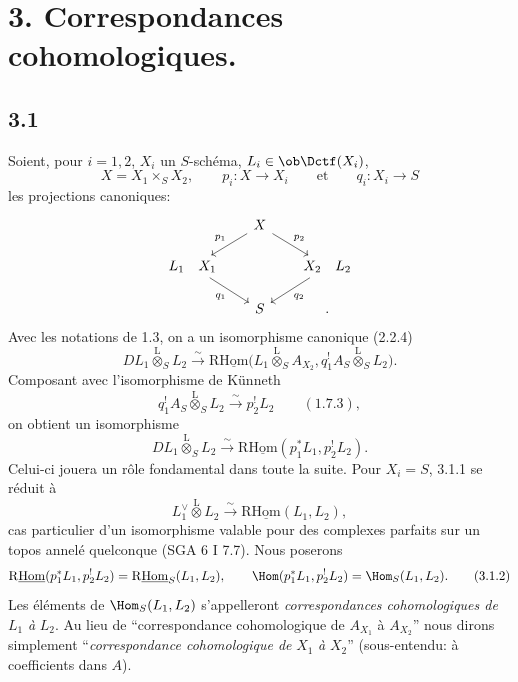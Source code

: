\clearpage
\section*{3. Correspondances cohomologiques.}

\subsection*{3.1}
Soient, pour $i=1,2$, $X_i$ un $S$-schéma, $L_i\in\ob\Dctf(X_i)$,
\[
X=X_1\times_S X_2,
\qquad
p_i:X\longrightarrow X_i
\qquad\text{et}\qquad
q_i:X_i\longrightarrow S
\]
les projections canoniques:
\[
\begin{tikzcd}[column sep=1.8em,row sep=1.5em]
& X \arrow[dl,"p_1"'] \arrow[dr,"p_2"] & \\
L_1\quad X_1 \arrow[dr,"q_1"'] & & X_2\quad L_2 \arrow[dl,"q_2"] \\
& S & .
\end{tikzcd}
\]
Avec les notations de 1.3, on a un isomorphisme canonique (2.2.4)
\[
DL_1\overset{\mathrm{L}}{\otimes}_S L_2
\xrightarrow{\sim}
\mathrm{R}\underline{\mathrm{Hom}}\bigl(L_1\overset{\mathrm{L}}{\otimes}_S A_{X_2},
q_1^!A_S\overset{\mathrm{L}}{\otimes}_S L_2\bigr).
\]
Composant avec l'isomorphisme de Künneth
\[
q_1^!A_S\overset{\mathrm{L}}{\otimes}_S L_2
\xrightarrow{\sim}p_2^!L_2 \qquad (1.7.3),
\]
on obtient un isomorphisme
\begin{equation}
DL_1\overset{\mathrm{L}}{\otimes}_S L_2
\xrightarrow{\sim}
\mathrm{R}\underline{\mathrm{Hom}}(p_1^*L_1,p_2^!L_2).
\tag{3.1.1}
\end{equation}
Celui-ci jouera un rôle fondamental dans toute la suite. Pour $X_i=S$, 3.1.1 se réduit à
\[
L_1^\vee\overset{\mathrm{L}}{\otimes}L_2\xrightarrow{\sim}\mathrm{R}\underline{\mathrm{Hom}}(L_1,L_2),
\]
cas particulier d'un isomorphisme valable pour des complexes parfaits sur un topos annelé quelconque (SGA 6 I 7.7). Nous poserons
\begin{equation}
\mathrm{R}\underline{\mathrm{Hom}}(p_1^*L_1,p_2^!L_2)=\mathrm{R}\underline{\mathrm{Hom}}_S(L_1,L_2),
\qquad
\Hom(p_1^*L_1,p_2^!L_2)=\Hom_S(L_1,L_2).
\tag{3.1.2}
\end{equation}
Les éléments de $\Hom_S(L_1,L_2)$ s'appelleront \emph{correspondances cohomologiques de} $L_1$ \emph{à} $L_2$. Au lieu de ``correspondance cohomologique de $A_{X_1}$ à $A_{X_2}$'' nous dirons simplement ``\emph{correspondance cohomologique de} $X_1$ \emph{à} $X_2$'' (sous-entendu: à coefficients dans $A$).

